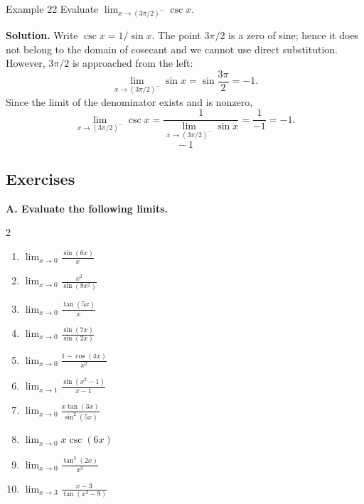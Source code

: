 \begin{examplebox}{Example 22}
Evaluate \(\displaystyle \lim_{x \to (3\pi/2)^{-}} \csc x\).

\medskip
\textbf{Solution.}
Write \(\csc x = 1 / \sin x\). The point \(3\pi/2\) is a zero of sine; hence it does not belong to the domain of cosecant and we cannot use direct substitution. However, \(3\pi/2\) is approached from the left:
\[
\lim_{x \to (3\pi/2)^{-}} \sin x = \sin\frac{3\pi}{2} = -1.
\]
Since the limit of the denominator exists and is nonzero,
\[
\lim_{x \to (3\pi/2)^{-}} \csc x
= \frac{1}{\lim_{x \to (3\pi/2)^{-}} \sin x}
= \frac{1}{-1} = -1.
\]
\[
\boxed{\;-1\;}
\]
\end{examplebox}

\subsection*{Exercises}
\label{subsec:1.6.5}

\noindent\textbf{A. Evaluate the following limits.}
\begin{multicols}{2}
\begin{enumerate}
    \setlength{\itemsep}{3pt}
    \setlength{\parsep}{0pt}
    \setlength{\topsep}{2pt}
    \item \(\displaystyle \lim_{x \to 0} \frac{\sin(6x)}{x}\)
    \item \(\displaystyle \lim_{x \to 0} \frac{x^{2}}{\sin(8x^{2})}\)
    \item \(\displaystyle \lim_{x \to 0} \frac{\tan(5x)}{x}\)
    \item \(\displaystyle \lim_{x \to 0} \frac{\sin(7x)}{\sin(2x)}\)
    \item \(\displaystyle \lim_{x \to 0} \frac{1 - \cos(4x)}{x^{2}}\)
    \item \(\displaystyle \lim_{x \to 1} \frac{\sin(x^{2} - 1)}{x - 1}\)
    \item \(\displaystyle \lim_{x \to 0} \frac{x \tan(3x)}{\sin^{2}(5x)}\)
    \item \(\displaystyle \lim_{x \to 0} x \csc(6x)\)
    \item \(\displaystyle \lim_{x \to 0} \frac{\tan^{3}(2x)}{x^{3}}\)
        \item \(\displaystyle \lim_{x \to 3} \frac{x - 3}{\tan(x^{2} - 9)}\)

\end{enumerate}
\end{multicols}

